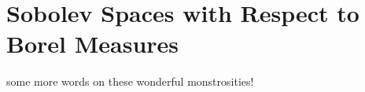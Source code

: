 \section{Sobolev Spaces with Respect to Borel Measures}

some more words on these wonderful monstrosities!